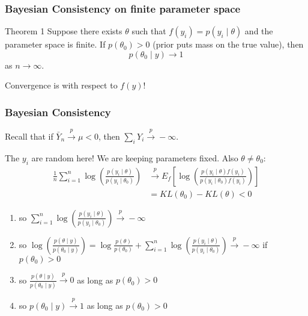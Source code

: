 \documentclass{beamer}
\begin{document}
\begin{frame}
\frametitle{Bayesian Consistency on finite parameter space}

\begin{block}{Theorem 1}
Suppose there exists $\theta$ such that $f(y_i) = p(y_i \mid \theta)$ and the parameter space is finite. If $p(\theta_0) > 0$ (prior puts mass on the true value), then
$$
p(\theta_0 \mid y) \to 1 
$$
as $n \to \infty$.
\end{block}
Convergence is with respect to $f(y)$!

\end{frame}
\begin{frame}
\frametitle{Bayesian Consistency }

Recall that if $\bar{Y}_n \overset{p}{\to} \mu < 0$, then $\sum_i Y_i \overset{p}{\to} -\infty$.
\newline

The $y_i$ are random here! We are keeping parameters fixed. Also $\theta \neq \theta_0$:
\begin{align*}
\frac{1}{n} \sum_{i=1}^n \log \left(\frac{p(y_i \mid \theta) }{p(y_i \mid \theta_0) } \right) &\overset{p}{\to} E_f\left[\log \left(\frac{p(y_i \mid \theta)f(y_i) }{p(y_i \mid \theta_0)f(y_i) } \right) \right] \\
&= KL(\theta_0) - KL(\theta) < 0
\end{align*}


\begin{enumerate}
\item so $\sum_{i=1}^n \log \left(\frac{p(y_i \mid \theta) }{p(y_i \mid \theta_0) } \right) \overset{p}{\to} -\infty$
\item so $\log \left(\frac{p(\theta \mid y)}{ p(\theta_0 \mid y) } \right) = \log \frac{p(\theta)}{p(\theta_0)} + \sum_{i=1}^n \log \left(\frac{p(y_i \mid \theta) }{p(y_i \mid \theta_0) } \right) \overset{p}{\to} -\infty$ if $p(\theta_0 ) > 0 $
\item so $\frac{p(\theta \mid y)}{ p(\theta_0 \mid y) }   \overset{p}{\to} 0$ as long as $p(\theta_0) > 0$
\item so $p(\theta_0 \mid y)  \overset{p}{\to} 1$ as long as $p(\theta_0) > 0$
\end{enumerate}

\end{frame}
\end{document}
